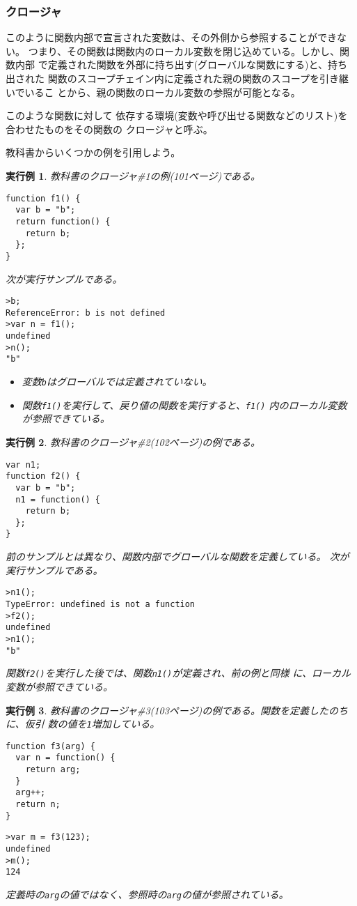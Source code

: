 \documentclass[a4j]{jarticle}
\newtheorem{Exec}{実行例}[section]
\begin{document}
\subsubsection{クロージャ}
このように関数内部で宣言された変数は、その外側から参照することができない。
つまり、その関数は関数内のローカル変数を閉じ込めている。しかし、関数内部
で定義された関数を外部に持ち出す(グローバルな関数にする)と、持ち出された
関数のスコープチェイン内に定義された親の関数のスコープを引き継いでいるこ
とから、親の関数のローカル変数の参照が可能となる。

このような関数に対して
依存する環境(変数や呼び出せる関数などのリスト)を合わせたものをその関数の
クロージャと呼ぶ。

教科書からいくつかの例を引用しよう。
\begin{Exec}
 教科書のクロージャ\#1の例(101ページ)である。
\begin{Verbatim}
function f1() {
  var b = "b";
  return function() {
    return b;
  };
}
\end{Verbatim}
次が実行サンプルである。
\begin{Verbatim}
>b;
ReferenceError: b is not defined
>var n = f1();
undefined
>n();
"b"
\end{Verbatim}
\begin{itemize}
 \item 変数\verb+b+はグローバルでは定義されていない。
 \item 関数\verb+f1()+を実行して、戻り値の関数を実行すると、\verb+f1()+
       内のローカル変数が参照できている。
\end{itemize}
\end{Exec}
\begin{Exec}
 教科書のクロージャ\#2(102ページ)の例である。
\begin{Verbatim}
var n1;
function f2() {
  var b = "b";
  n1 = function() {
    return b;
  };
}
\end{Verbatim}
前のサンプルとは異なり、関数内部でグローバルな関数を定義している。
次が実行サンプルである。
\begin{Verbatim}
>n1();
TypeError: undefined is not a function
>f2();
undefined
>n1();
"b"
\end{Verbatim}
関数\verb+f2()+を実行した後では、関数\verb+n1()+が定義され、前の例と同様
 に、ローカル変数が参照できている。
\end{Exec}
\begin{Exec}
 教科書のクロージャ\#3(103ページ)の例である。関数を定義したのちに、仮引
 数の値を\verb+1+増加している。
\begin{Verbatim}
function f3(arg) {
  var n = function() {
    return arg;
  }
  arg++;
  return n;
}
\end{Verbatim}
\begin{Verbatim}
>var m = f3(123);
undefined
>m();
124
\end{Verbatim}
定義時の\verb+arg+の値ではなく、参照時の\verb+arg+の値が参照されている。
\end{Exec}
\end{document}
